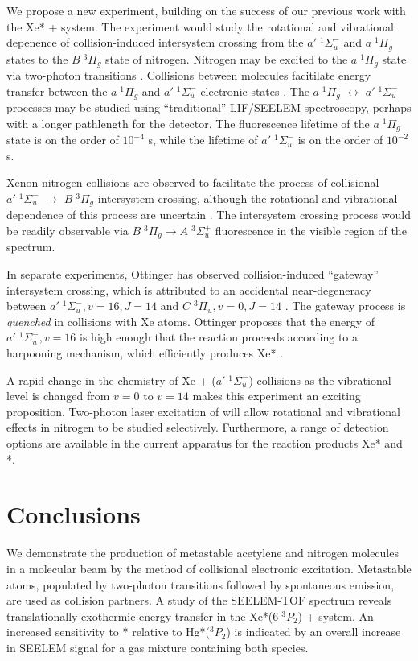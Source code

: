 \documentclass[12pt]{mitthesis}
\begin{document}
We propose a new experiment, building on the success of our previous
work with the Xe* +  system.  The experiment would study the
rotational and vibrational depenence of collision-induced intersystem
crossing from the $a' \; ^1\Sigma_u^-$ and $a \; ^1\Pi_g$ states to
the $B \; ^3\Pi_g$ state of nitrogen.  Nitrogen may be excited to the
$a \; ^1\Pi_g$ state via two-photon transitions \cite{vanveen82}.
Collisions between  molecules facitilate energy transfer
between the $a \; ^1\Pi_g$ and $a' \; ^1\Sigma_u^-$ electronic states
\cite{marinelli88}.  The $a \; ^1\Pi_g$ $\leftrightarrow$ $a' \;
^1\Sigma_u^-$ processes may be studied using ``traditional''
LIF/SEELEM spectroscopy, perhaps with a longer pathlength for the
detector.  The fluorescence lifetime of the $a \; ^1\Pi_g$ state is on
the order of $10^{-4}$ s, while the lifetime of $a' \; ^1\Sigma_u^-$
is on the order of $10^{-2}$ s.

Xenon-nitrogen collisions are observed to facilitate the process of
collisional $a' \; ^1\Sigma_u^-$ $\rightarrow$ $B \; ^3\Pi_g$
intersystem crossing, although the rotational and vibrational
dependence of this process are uncertain \cite{umemoto03a}.  The
intersystem crossing process would be readily observable via $B \;
^3\Pi_g \rightarrow A \; ^3\Sigma_u^+$ fluorescence in the visible
region of the spectrum.

In separate experiments, Ottinger has observed collision-induced
``gateway'' intersystem crossing, which is attributed to an accidental
near-degeneracy between $a' \; ^1\Sigma_u^-, v=16, J=14$ and $C \;
^3\Pi_u, v=0, J=14$ \cite{ottinger98}.  The gateway process is
\emph{quenched} in collisions with Xe atoms.  Ottinger proposes that
the energy of $a' \; ^1\Sigma_u^-, v=16$ is high enough that the
reaction proceeds according to a harpooning mechanism, which
efficiently produces Xe* \cite{ottinger98}.

A rapid change in the chemistry of Xe + ($a' \; ^1\Sigma_u^-$)
collisions as the vibrational level is changed from $v=0$ to $v=14$
makes this experiment an exciting proposition.  Two-photon laser
excitation of  will allow rotational and vibrational effects in
nitrogen to be studied selectively.  Furthermore, a range of detection
options are available in the current apparatus for the reaction
products Xe* and *.

\section{Conclusions}

We demonstrate the production of metastable acetylene and nitrogen
molecules in a molecular beam by the method of collisional electronic
excitation.  Metastable atoms, populated by two-photon transitions
followed by spontaneous emission, are used as collision partners.  A
study of the SEELEM-TOF spectrum reveals translationally exothermic
energy transfer in the Xe*($6 \; ^3P_2$) +  system.  An
increased sensitivity to * relative to Hg*($^3P_2$) is
indicated by an overall increase in SEELEM signal for a gas mixture
containing both species.

 

\end{document}
